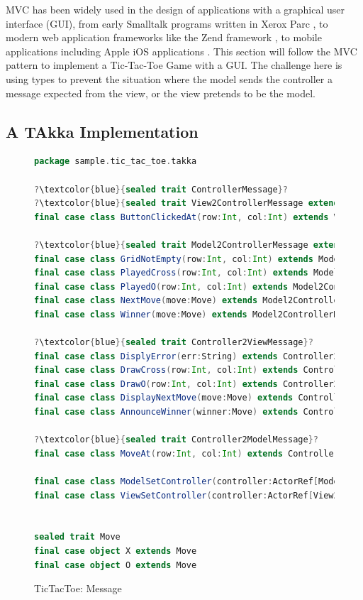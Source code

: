 MVC has been widely used in the design of applications with a graphical user 
interface (GUI), from early Smalltalk programs written in Xerox Parc 
\citep{reenskaug1979original, reenskaug2003model}, to modern web application 
frameworks like the Zend framework \citep{allen2009zend}, to mobile 
applications including Apple iOS applications \citep{apple:objc}.  This 
section will follow the MVC pattern to implement a Tic-Tac-Toe Game with a 
GUI.  The challenge here is using types to prevent the 
situation where the model sends the controller a message expected from the 
view, or the view pretends to be the model. 
 


\subsection{A TAkka Implementation}




\begin{figure}[p]
\begin{lstlisting}[language=scala, escapechar=?]
package sample.tic_tac_toe.takka

?\textcolor{blue}{sealed trait ControllerMessage}?
?\textcolor{blue}{sealed trait View2ControllerMessage extends ControllerMessage}?
final case class ButtonClickedAt(row:Int, col:Int) extends View2ControllerMessage

?\textcolor{blue}{sealed trait Model2ControllerMessage extends ControllerMessage}?
final case class GridNotEmpty(row:Int, col:Int) extends Model2ControllerMessage
final case class PlayedCross(row:Int, col:Int) extends Model2ControllerMessage
final case class PlayedO(row:Int, col:Int) extends Model2ControllerMessage
final case class NextMove(move:Move) extends Model2ControllerMessage
final case class Winner(move:Move) extends Model2ControllerMessage

?\textcolor{blue}{sealed trait Controller2ViewMessage}?
final case class DisplyError(err:String) extends Controller2ViewMessage
final case class DrawCross(row:Int, col:Int) extends Controller2ViewMessage
final case class DrawO(row:Int, col:Int) extends Controller2ViewMessage
final case class DisplayNextMove(move:Move) extends Controller2ViewMessage
final case class AnnounceWinner(winner:Move) extends Controller2ViewMessage

?\textcolor{blue}{sealed trait Controller2ModelMessage}?
final case class MoveAt(row:Int, col:Int) extends Controller2ModelMessage

final case class ModelSetController(controller:ActorRef[Model2ControllerMessage]) extends Controller2ModelMessage
final case class ViewSetController(controller:ActorRef[View2ControllerMessage]) extends Controller2ViewMessage


sealed trait Move
final case object X extends Move
final case object O extends Move
\end{lstlisting}
\caption{TicTacToe: Message}
\label{TTT_message}
\end{figure}

